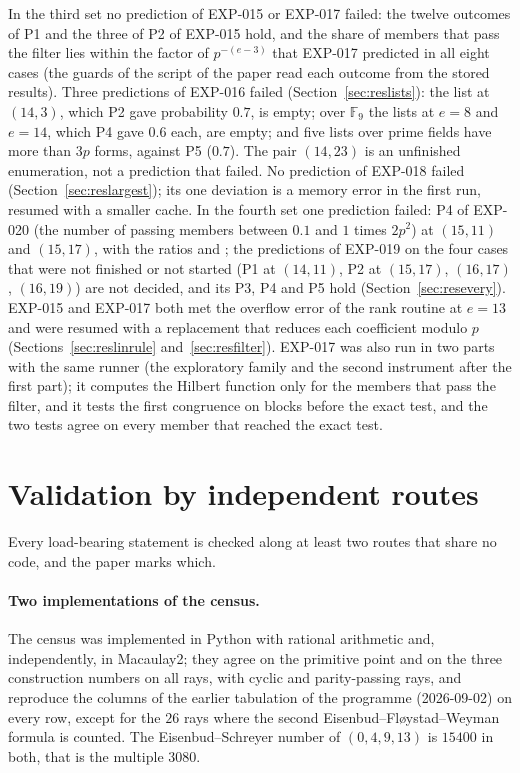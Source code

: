 \documentclass[11pt]{article}
\theoremstyle{definition}
\theoremstyle{remark}
\newcommand{\EXP}[1]{\mbox{EXP-#1}}
\newcommand{\F}{\mathbb{F}}
\begin{document}
In the third set no prediction of \EXP{015} or \EXP{017} failed: the twelve outcomes of P1 and the three of P2 of \EXP{015} hold, and the share of members that pass the filter lies within the factor of $p^{-(e-3)}$ that \EXP{017} predicted in all eight cases (the guards of the script of the paper read each outcome from the stored results). Three predictions of \EXP{016} failed (Section~\ref{sec:reslists}): the list at $(14,3)$, which P2 gave probability $0.7$, is empty; over $\F_9$ the lists at $e=8$ and $e=14$, which P4 gave $0.6$ each, are empty; and five lists over prime fields have more than $3p$ forms, against P5 ($0.7$). The pair $(14,23)$ is an unfinished enumeration, not a prediction that failed. No prediction of \EXP{018} failed (Section~\ref{sec:reslargest}); its one deviation is a memory error in the first run, resumed with a smaller cache. In the fourth set one prediction failed: P4 of \EXP{020} (the number of passing members between $0.1$ and $1$ times $2p^2$) at $(15,11)$ and $(15,17)$, with the ratios \nsymRatioFifteenEleven{} and \nsymRatioFifteenSeventeen{}; the predictions of \EXP{019} on the four cases that were not finished or not started (P1 at $(14,11)$, P2 at $(15,17)$, $(16,17)$, $(16,19)$) are not decided, and its P3, P4 and P5 hold (Section~\ref{sec:resevery}). \EXP{015} and \EXP{017} both met the overflow error of the rank routine at $e=13$ and were resumed with a replacement that reduces each coefficient modulo $p$ (Sections~\ref{sec:reslinrule} and~\ref{sec:resfilter}). \EXP{017} was also run in two parts with the same runner (the exploratory family and the second instrument after the first part); it computes the Hilbert function only for the members that pass the filter, and it tests the first congruence on blocks before the exact test, and the two tests agree on every member that reached the exact test.

\FloatBarrier
\section{Validation by independent routes}
\label{sec:validation}

Every load-bearing statement is checked along at least two routes that share no code, and the paper marks which.

\paragraph{Two implementations of the census.} The census was implemented in Python with rational arithmetic and, independently, in Macaulay2; they agree on the primitive point and on the three construction numbers on all \nrays{} rays, with \ncyclic{} cyclic and \nparityPassing{} parity-passing rays, and reproduce the columns of the earlier tabulation of the programme (2026-09-02) on every row, except for the $26$ rays where the second Eisenbud--Fl{\o}ystad--Weyman formula is counted. The Eisenbud--Schreyer number of $(0,4,9,13)$ is $15400$ in both, that is the multiple $3080$.
\end{document}
